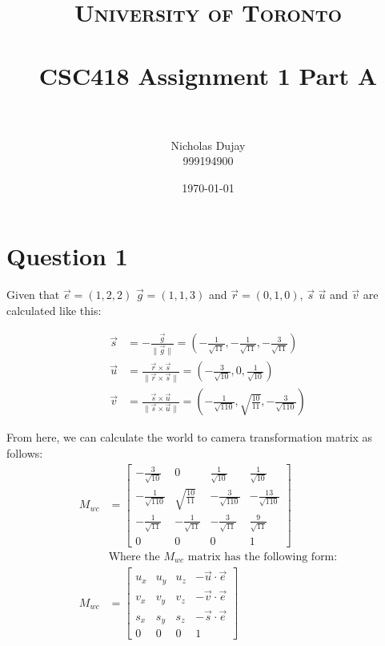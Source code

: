 \documentclass{article} %
\title{
\normalfont \normalsize
\textsc{University of Toronto} \\ [25pt] %
\horrule{0.5pt} \\[0.4cm] %
\huge CSC418 Assignment 1 Part A \\ %
\horrule{2pt} \\[0.5cm] %
}
\author{Nicholas Dujay\\999194900} %
\date{\normalsize\today} %
\begin{document}
\maketitle %


\section{Question 1}
Given that $\vec{e} = (1,2,2)$ $\vec{g} =(1,1,3)$ and $\vec{r}=(0,1,0)$, $\vec{s}$ $\vec{u}$ and $\vec{v}$ are calculated like this:

\begin{align*}
\vec{s}&=-\frac{\vec{g}}{\| \vec{g} \|} = \left(-\frac{1}{\sqrt{11}},-\frac{1}{\sqrt{11}},-\frac{3}{\sqrt{11}} \right) \\
\vec{u}&=\frac{\vec{r} \times \vec{s}}{\|\vec{r} \times \vec{s}\|} = \left(-\frac{3}{\sqrt{10}},0,\frac{1}{\sqrt{10}} \right)\\
\vec{v}&=\frac{\vec{s} \times \vec{u}}{\|\vec{s} \times \vec{u}\|} = \left(-\frac{1}{\sqrt{110}},\sqrt{\frac{10}{11}},-\frac{3}{\sqrt{110}} \right)
\end{align*}

From here, we can calculate the world to camera transformation matrix as follows:
\begin{align*}
M_{wc} &= \left[
\begin{array}{ccc|c}
-\frac{3}{\sqrt{10}} & 0 & \frac{1}{\sqrt{10}}  & \frac{1}{\sqrt{10}}\\
-\frac{1}{\sqrt{110}} & \sqrt{\frac{10}{11}} & -\frac{3}{\sqrt{110}} & -\frac{13}{\sqrt{110}}\\
-\frac{1}{\sqrt{11}} & -\frac{1}{\sqrt{11}} & -\frac{3}{\sqrt{11}} & \frac{9}{\sqrt{11}}\\
0 & 0 & 0 & 1
\end{array}
\right]\\
&\text{Where the $M_{wc}$ matrix has the following form:}\\
M_{wc} &= \left[
\begin{array}{ccc|c}
u_x & u_y & u_z & -\vec{u} \cdot \vec{e} \\
v_x & v_y & v_z & -\vec{v} \cdot \vec{e} \\
s_x & s_y & s_z & -\vec{s} \cdot \vec{e} \\
0 & 0 & 0 & 1
\end{array}
\right]
\end{align*}
\end{document}
